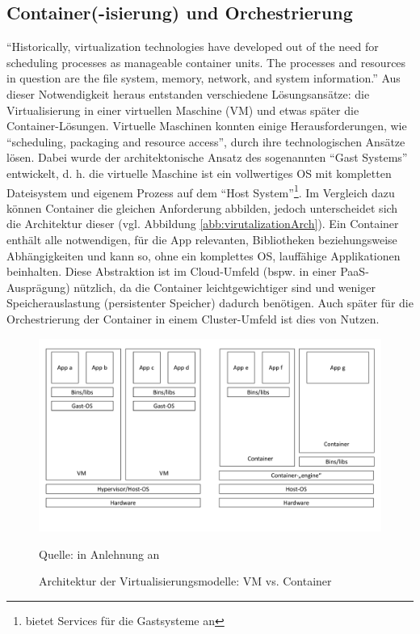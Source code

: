 \subsection{Container(-isierung) und Orchestrierung}
\enquote{Historically, virtualization technologies have developed out of the need for scheduling processes as manageable container units. The processes and resources in question are the file system, memory, network, and system information.}\autocite[][S.25]{pahl_containerization_2015} Aus dieser Notwendigkeit heraus entstanden verschiedene Lösungsansätze: die Virtualisierung in einer virtuellen Maschine (\ac{VM}) und etwas später die Container-Lösungen. Virtuelle Maschinen konnten einige Herausforderungen, wie \enquote{scheduling, packaging and resource access}, durch ihre technologischen Ansätze lösen. Dabei wurde der architektonische Ansatz des sogenannten \enquote{Gast Systems} entwickelt, d. h. die virtuelle Maschine ist ein vollwertiges \ac{OS} mit kompletten Dateisystem und eigenem Prozess auf dem \enquote{Host System}\footnote{bietet Services für die Gastsysteme an}. Im Vergleich dazu können Container die gleichen Anforderung abbilden, jedoch unterscheidet sich die Architektur dieser (vgl. Abbildung \vref{abb:virutalizationArch}). Ein Container enthält alle notwendigen, für die App relevanten, Bibliotheken beziehungsweise Abhängigkeiten und kann so, ohne ein komplettes \ac{OS}, lauffähige Applikationen beinhalten. Diese Abstraktion ist im Cloud-Umfeld (bspw. in einer \ac{PaaS}-Ausprägung) nützlich, da die Container leichtgewichtiger sind und weniger Speicherauslastung (persistenter Speicher) dadurch benötigen. Auch später für die Orchestrierung der Container in einem Cluster-Umfeld ist dies von Nutzen. 

\begin{figure}[H]
	\centering
	\includegraphics[scale=0.44]{img/virtualization architecture.pdf}
	\caption{Architektur der Virtualisierungsmodelle: VM vs. Container}
	{\footnotesize Quelle: in Anlehnung an \cite{pahl_containerization_2015}}
	\label{abb:virutalizationArch}
\end{figure}

